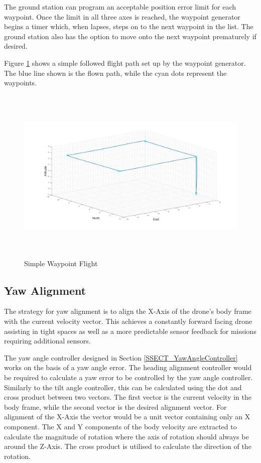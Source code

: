 		The ground station can program an acceptable position error limit for each waypoint. Once the limit in all three axes is reached, the waypoint generator begins a timer which, when lapses, steps on to the next waypoint in the list. The ground station also has the option to move onto the next waypoint prematurely if desired.
		
		Figure \ref{IM_WaypointFlight} shows a simple followed flight path set up by the waypoint generator. The blue line shown is the flown path, while the cyan dots represent the waypoints.
		
		\begin{figure}[H]
			\centering
			\includegraphics[height = 8.5cm]{../References/Diagrams/SimpleWaypointFlight.jpg}     
			\caption{Simple Waypoint Flight}
			\label{IM_WaypointFlight}
		\end{figure}
		
		\subsection{Yaw Alignment}
		The strategy for yaw alignment is to align the X-Axis of the drone's body frame with the current velocity vector. This achieves a constantly forward facing drone assisting in tight spaces as well as a more predictable sensor feedback for missions requiring additional sensors.
		
		The yaw angle controller designed in Section \ref{SSECT_YawAngleController} works on the basis of a yaw angle error. The heading alignment controller would be required to calculate a yaw error to be controlled by the yaw angle controller. Similarly to the tilt angle controller, this can be calculated using the dot and cross product between two vectors. The first vector is the current velocity in the body frame, while the second vector is the desired alignment vector. For alignment of the X-Axis the vector would be a unit vector containing only an X component. The X and Y components of the body velocity are extracted to calculate the magnitude of rotation where the axis of rotation should always be around the Z-Axis. The cross product is utilised to calculate the direction of the rotation. 
		
